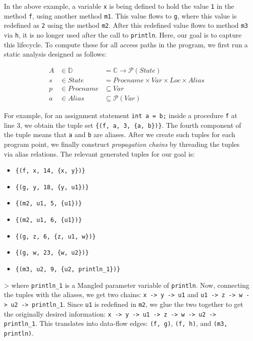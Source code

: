

In the above example, a variable \texttt{x} is being defined to hold the value \texttt{1} in the method
\texttt{f}, using another method \texttt{m1}. This value flows to \texttt{g}, where this
value is redefined as \texttt{2} using the method \texttt{m2}. After this redefined
value flows to method \texttt{m3} via \texttt{h}, it is no longer used after the call to
\texttt{println}. Here, our goal is to capture this lifecycle. To compute these
for all access paths in the program, we first run a static analysis designed as follows:

\begin{align*}
  A &\in \mathbb{D} &= \mathbb{C}\rightarrow\mathcal{P}(State)\\
  s &\in State &= Procname\times Var\times Loc\times Alias\\
  p &\in Procname &\subseteq Var\\
  a &\in Alias &\subseteq \mathcal{P}(Var)
\end{align*}

For example, for an assignment statement \texttt{int a = b;} inside a procedure
\texttt{f} at line 3, we obtain the tuple set \texttt{\{(f, a, 3, \{a, b\})\}}.
The fourth component of the tuple means that \texttt{a} and \texttt{b} are
aliases. After we create such tuples for each program point, we finally construct
\emph{propagation chains} by threading the tuples via alias relations. The
relevant generated tuples for our goal is:

\begin{itemize}
\item \texttt{\{(f, x, 14, \{x, y\})\}}
\item \texttt{\{(g, y, 18, \{y, u1\})\}}
\item \texttt{\{(m2, u1, 5, \{u1\})\}}
\item \texttt{\{(m2, u1, 6, \{u1\})\}}
\item \texttt{\{(g, z, 6, \{z, u1, w\})\}}
\item \texttt{\{(g, w, 23, \{w, u2\})\}}
\item \texttt{\{(m3, u2, 9, \{u2, println\_1\})\}}
\end{itemize}

>
where \texttt{println\_1} is a Mangled parameter variable of \texttt{println}.
Now, connecting the tuples with the aliases, we get two chains:
\texttt{x -> y -> u1} and \texttt{u1 -> z -> w -> u2 -> println\_1}. Since \texttt{u1} is
redefined in \texttt{m2}, we glue the two together to get the originally desired
information: \texttt{x -> y -> u1 -> z -> w -> u2 -> println\_1}. This translates
into data-flow edges: \texttt{(f, g)}, \texttt{(f, h)}, and \texttt{(m3, println)}.

